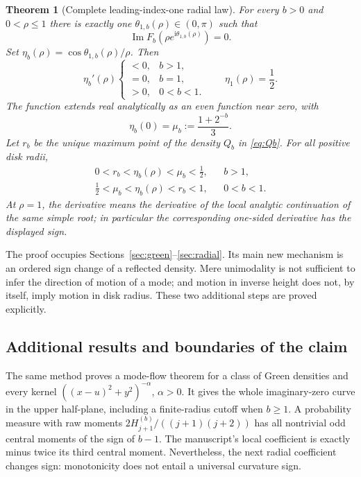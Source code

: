 \documentclass[11pt]{article}
\numberwithin{equation}{section}
\newtheorem{theorem}{Theorem}[section]
\theoremstyle{definition}
\theoremstyle{remark}
\DeclareMathOperator{\Imn}{Im}
\newcommand{\ii}{\mathrm i}
\begin{document}
\begin{theorem}[Complete leading-index-one radial law]\label{thm:main}
For every $b>0$ and $0<\rho\le1$ there is exactly one
$\theta_{1,b}(\rho)\in(0,\pi)$ such that
\[
 \Imn F_b(\rho e^{\ii\theta_{1,b}(\rho)})=0.
\]
Set $\eta_b(\rho)=\cos\theta_{1,b}(\rho)/\rho$. Then
\begin{equation}\label{eq:main-sign}
 \eta_b'(\rho)
 \begin{cases}
 <0,&b>1,\\
 =0,&b=1,\\
 >0,&0<b<1.
 \end{cases}
 \qquad \eta_1(\rho)=\frac12.
\end{equation}
The function extends real analytically as an even function near zero,
with
\begin{equation}\label{eq:meanb}
 \eta_b(0)=\mu_b:=\frac{1+2^{-b}}3.
\end{equation}
Let $r_b$ be the unique maximum point of the density $Q_b$ in
\eqref{eq:Qb}. For all positive disk radii,
\begin{align}
 0<r_b<\eta_b(\rho)<\mu_b<\tfrac12,
       && b>1,\label{eq:boundsbhigh}\\
 \tfrac12<\mu_b<\eta_b(\rho)<r_b<1,
       && 0<b<1.\label{eq:boundsblow}
\end{align}
At $\rho=1$, the derivative means the derivative of the local analytic
continuation of the same simple root; in particular the corresponding
one-sided derivative has the displayed sign.
\end{theorem}

The proof occupies Sections~\ref{sec:green}--\ref{sec:radial}. Its main
new mechanism is an ordered sign change of a reflected density. Mere
unimodality is not sufficient to infer the direction of motion of a mode;
and motion in inverse height does not, by itself, imply motion in disk
radius. These two additional steps are proved explicitly.

\subsection{Additional results and boundaries of the claim}
The same method proves a mode-flow theorem for a class of Green densities
and every kernel $((x-u)^2+y^2)^{-\alpha}$, $\alpha>0$.
It gives the whole imaginary-zero curve in the upper half-plane, including
a finite-radius cutoff when $b\ge1$. A probability measure with raw
moments $2H_{j+1}^{(b)}/((j+1)(j+2))$ has all nontrivial odd central
moments of the sign of $b-1$. The manuscript's local coefficient is
exactly minus twice its third central moment. Nevertheless, the next
radial coefficient changes sign: monotonicity does not entail a universal
curvature sign.
\end{document}
